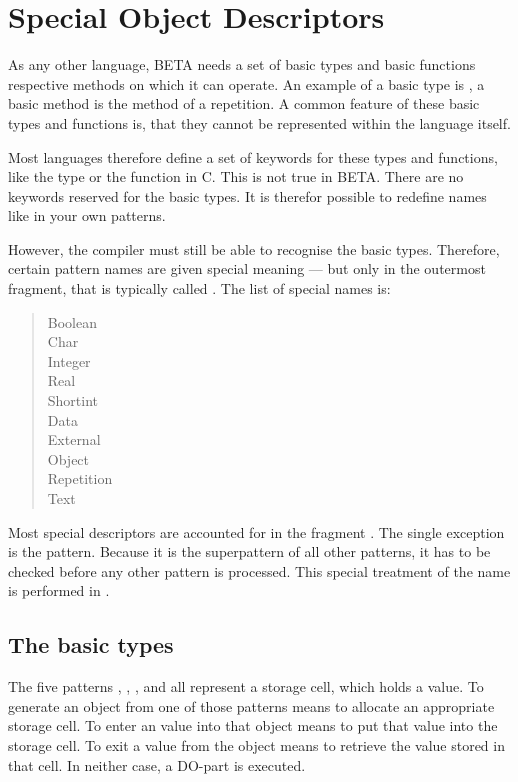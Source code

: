 \section{Special Object Descriptors}
As any other language, BETA needs a set of basic types and basic
functions respective methods on which it can operate.  An example
of a basic type is , a basic method is the
 method of a repetition.  A common feature of these
basic types and functions is, that they cannot be represented
within the language itself.

Most languages therefore define a set of keywords for these types
and functions, like the type  or the function
 in C.  This is not true in BETA.  There are no
keywords reserved for the basic types.  It is therefor possible
to redefine names like  in your own patterns.

However, the compiler must still be able to recognise the basic
types.  Therefore, certain pattern names are given special
meaning --- but only in the outermost fragment, that is typically
called .  The list of special names is:
\begin{quote}
	Boolean \\
	Char \\
	Integer \\
	Real \\
	Shortint \\[2ex]
	Data \\
	External \\
	Object \\
	Repetition \\
	Text
\end{quote}

Most special descriptors are accounted for in the fragment
.  The single
exception is the  pattern.  Because it is the
superpattern of all other patterns, it has to be checked before
any other pattern is processed.  This special treatment of the
name  is performed in
.

\subsection{The basic types}
The five patterns , , ,
 and  all represent a storage cell, which
holds a value.  To generate an object from one of those patterns
means to allocate an appropriate storage cell.  To enter an value
into that object means to put that value into the storage cell.
To exit a value from the object means to retrieve the value
stored in that cell.  In neither case, a DO-part is executed.

